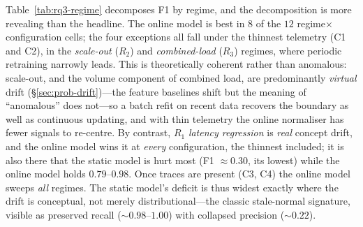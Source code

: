 \documentclass[pdflatex,sn-mathphys-num]{sn-jnl}%
\theoremstyle{thmstyleone}%
\theoremstyle{thmstyletwo}%
\theoremstyle{thmstylethree}%
\begin{document}
Table~\ref{tab:rq3-regime} decomposes F1 by regime, and the decomposition is more revealing than the headline. The online model is best in $8$ of the $12$ regime$\times$configuration cells; the four exceptions all fall under the thinnest telemetry (C1 and C2), in the \emph{scale-out} ($R_2$) and \emph{combined-load} ($R_3$) regimes, where periodic retraining narrowly leads. This is theoretically coherent rather than anomalous: scale-out, and the volume component of combined load, are predominantly \emph{virtual} drift (\S\ref{sec:prob-drift})---the feature baselines shift but the meaning of ``anomalous'' does not---so a batch refit on recent data recovers the boundary as well as continuous updating, and with thin telemetry the online normaliser has fewer signals to re-centre. By contrast, $R_1$ \emph{latency regression} is \emph{real} concept drift, and the online model wins it at \emph{every} configuration, the thinnest included; it is also there that the static model is hurt most (F1 $\approx 0.30$, its lowest) while the online model holds $0.79$--$0.98$. Once traces are present (C3, C4) the online model sweeps \emph{all} regimes. The static model's deficit is thus widest exactly where the drift is conceptual, not merely distributional---the classic stale-normal signature, visible as preserved recall ($\sim 0.98$--$1.00$) with collapsed precision ($\sim 0.22$).
\end{document}
